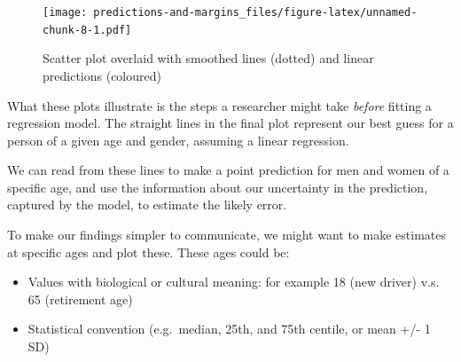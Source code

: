\documentclass[]{article}
\newenvironment{Shaded}{\begin{snugshade}}{\end{snugshade}}
\newcommand{\KeywordTok}[1]{\textcolor[rgb]{0.13,0.29,0.53}{\textbf{#1}}}
\newcommand{\DataTypeTok}[1]{\textcolor[rgb]{0.13,0.29,0.53}{#1}}
\newcommand{\DecValTok}[1]{\textcolor[rgb]{0.00,0.00,0.81}{#1}}
\newcommand{\StringTok}[1]{\textcolor[rgb]{0.31,0.60,0.02}{#1}}
\newcommand{\OperatorTok}[1]{\textcolor[rgb]{0.81,0.36,0.00}{\textbf{#1}}}
\newcommand{\NormalTok}[1]{#1}
\providecommand{\tightlist}{%
  \setlength{\itemsep}{0pt}\setlength{\parskip}{0pt}}
\theoremstyle{definition}
\theoremstyle{definition}
\theoremstyle{definition}
\theoremstyle{remark}
\begin{document}
\begin{Shaded}
\end{Shaded}

\begin{figure}
\centering
\texttt{[image: predictions-and-margins\_files/figure-latex/unnamed-chunk-8-1.pdf]}
\caption{\label{fig:unnamed-chunk-8}Scatter plot overlaid with smoothed
lines (dotted) and linear predictions (coloured)}
\end{figure}

What these plots illustrate is the steps a researcher might take
\emph{before} fitting a regression model. The straight lines in the
final plot represent our best guess for a person of a given age and
gender, assuming a linear regression.

We can read from these lines to make a point prediction for men and
women of a specific age, and use the information about our uncertainty
in the prediction, captured by the model, to estimate the likely error.

To make our findings simpler to communicate, we might want to make
estimates at specific ages and plot these. These ages could be:

\begin{itemize}
\tightlist
\item
  Values with biological or cultural meaning: for example 18 (new
  driver) v.s. 65 (retirement age)
\item
  Statistical convention (e.g.~median, 25th, and 75th centile, or mean
  +/- 1 SD)
\end{itemize}
\end{document}

